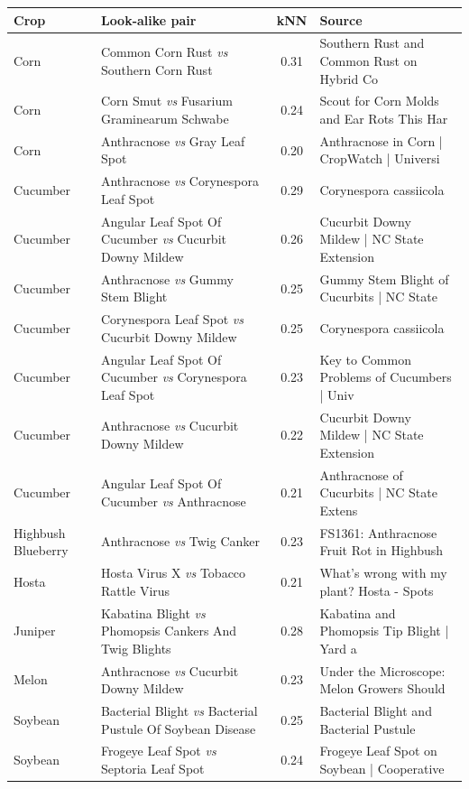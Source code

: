\documentclass[11pt]{article}
\begin{document}
{\footnotesize
\begin{longtable}{p{2.4cm}p{6.6cm}cp{4.0cm}}
\textbf{Crop} & \textbf{Look-alike pair} & \textbf{kNN} & \textbf{Source} \\\hline\endhead
Corn & Common Corn Rust \emph{vs} Southern Corn Rust & 0.31 & Southern Rust and Common Rust on Hybrid Co \\
Corn & Corn Smut \emph{vs} Fusarium Graminearum Schwabe & 0.24 & Scout for Corn Molds and Ear Rots This Har \\
Corn & Anthracnose \emph{vs} Gray Leaf Spot & 0.20 & Anthracnose in Corn | CropWatch | Universi \\
Cucumber & Anthracnose \emph{vs} Corynespora Leaf Spot & 0.29 & Corynespora cassiicola  \\
Cucumber & Angular Leaf Spot Of Cucumber \emph{vs} Cucurbit Downy Mildew & 0.26 & Cucurbit Downy Mildew | NC State Extension \\
Cucumber & Anthracnose \emph{vs} Gummy Stem Blight & 0.25 & Gummy Stem Blight of Cucurbits | NC State  \\
Cucumber & Corynespora Leaf Spot \emph{vs} Cucurbit Downy Mildew & 0.25 & Corynespora cassiicola  \\
Cucumber & Angular Leaf Spot Of Cucumber \emph{vs} Corynespora Leaf Spot & 0.23 & Key to Common Problems of Cucumbers | Univ \\
Cucumber & Anthracnose \emph{vs} Cucurbit Downy Mildew & 0.22 & Cucurbit Downy Mildew | NC State Extension \\
Cucumber & Angular Leaf Spot Of Cucumber \emph{vs} Anthracnose & 0.21 & Anthracnose of Cucurbits | NC State Extens \\
Highbush Blueberry & Anthracnose \emph{vs} Twig Canker & 0.23 & FS1361: Anthracnose Fruit Rot in Highbush  \\
Hosta & Hosta Virus X \emph{vs} Tobacco Rattle Virus & 0.21 & What's wrong with my plant? Hosta - Spots  \\
Juniper & Kabatina Blight \emph{vs} Phomopsis Cankers And Twig Blights & 0.28 & Kabatina and Phomopsis Tip Blight | Yard a \\
Melon & Anthracnose \emph{vs} Cucurbit Downy Mildew & 0.23 & Under the Microscope: Melon Growers Should \\
Soybean & Bacterial Blight \emph{vs} Bacterial Pustule Of Soybean Disease & 0.25 & Bacterial Blight and Bacterial Pustule  \\
Soybean & Frogeye Leaf Spot \emph{vs} Septoria Leaf Spot & 0.24 & Frogeye Leaf Spot on Soybean | Cooperative \\

\end{longtable}}
\end{document}
